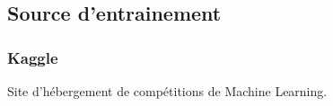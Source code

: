 \subsection{Source d'entrainement}

\begin{frame}
  \frametitle{Kaggle}
  Site d'hébergement de compétitions de Machine Learning.
\end{frame}
